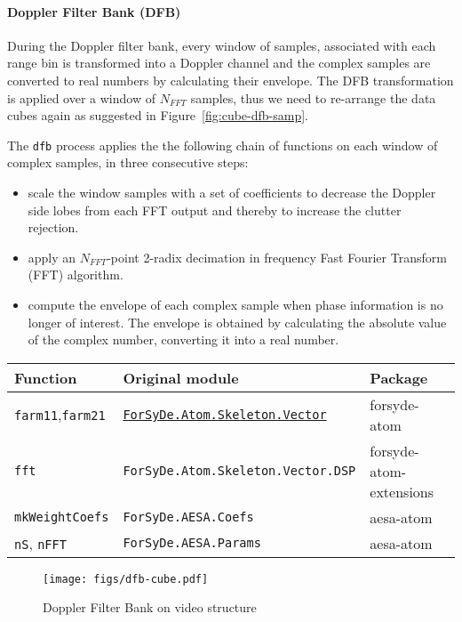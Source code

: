 \documentclass[
  a4paper,
]{article}
\let\oldparagraph\paragraph
\renewcommand{\paragraph}[1]{\oldparagraph{#1}\mbox{}}
\begin{document}
\hypertarget{sec:cube-dfb-atom}{%
\paragraph{Doppler Filter Bank (DFB)}\label{sec:cube-dfb-atom}}

During the Doppler filter bank, every window of samples, associated with
each range bin is transformed into a Doppler channel and the complex
samples are converted to real numbers by calculating their envelope. The
DFB transformation is applied over a window of \(N_{FFT}\) samples, thus
we need to re-arrange the data cubes again as suggested in
Figure~\ref{fig:cube-dfb-samp}.

The \texttt{dfb} process applies the the following chain of functions on
each window of complex samples, in three consecutive steps:

\begin{itemize}
\item
  scale the window samples with a set of coefficients to decrease the
  Doppler side lobes from each FFT output and thereby to increase the
  clutter rejection.
\item
  apply an \(N_{FFT}\)-point 2-radix decimation in frequency Fast
  Fourier Transform (FFT) algorithm.
\item
  compute the envelope of each complex sample when phase information is
  no longer of interest. The envelope is obtained by calculating the
  absolute value of the complex number, converting it into a real
  number.
\end{itemize}

\begin{longtable}[]{@{}lll@{}}
\toprule
Function & Original module & Package\tabularnewline
\midrule
\endhead
\texttt{farm11},\texttt{farm21} &
\href{https://forsyde.github.io/forsyde-atom/api/ForSyDe-Atom-Skeleton-Vector.html}{\texttt{ForSyDe.Atom.Skeleton.Vector}}
& forsyde-atom\tabularnewline
\texttt{fft} & \texttt{ForSyDe.Atom.Skeleton.Vector.DSP} &
forsyde-atom-extensions\tabularnewline
\texttt{mkWeightCoefs} & \texttt{ForSyDe.AESA.Coefs} &
aesa-atom\tabularnewline
\texttt{nS}, \texttt{nFFT} & \texttt{ForSyDe.AESA.Params} &
aesa-atom\tabularnewline
\bottomrule
\end{longtable}

\begin{figure}
\hypertarget{fig:cube-dfb-cube}{%
\centering
\texttt{[image: figs/dfb-cube.pdf]}
\caption{Doppler Filter Bank on video
structure}\label{fig:cube-dfb-cube}
}
\end{figure}
\end{document}
